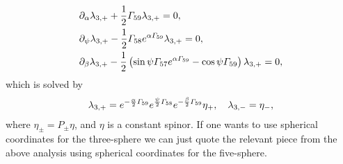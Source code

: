 \documentclass[11pt]{article}
\let\oldGamma=\Gamma
\renewcommand{\Gamma}{\mathnormal{\oldGamma}}
\newcommand{\sfrac}[2]{{\textstyle\frac{#1}{#2}}}
\newcommand{\p}{\partial}\newcommand{\quarter}{\sfrac{1}{4}}
\begin{document}
\begin{align}
&\p_\alpha\lambda_{3,+} + \frac{1}{2}\Gamma_{59} \lambda_{3,+} = 0,\nonumber\\
&\p_\psi\lambda_{3,+} - \frac{1}{2}  \Gamma_{58} e^{\alpha\Gamma_{59}}\lambda_{3,+} = 0,\nonumber\\
&\p_\beta\lambda_{3,+} - \frac{1}{2}\left(\sin\psi\Gamma_{57} e^{\alpha\Gamma_{59}}-\cos\psi\Gamma_{59}\right)\lambda_{3,+} = 0,
\end{align}
which is solved by
\begin{align}
\lambda_{3,+} = e^{-\frac{\alpha}{2}\Gamma_{59}}e^{\frac{\psi}{2}\Gamma_{58}}e^{-\frac{\beta}{2}\Gamma_{59}}\eta_+,\quad
\lambda_{3,-} = \eta_-,
\end{align}
where $\eta_{\pm} = P_\pm\eta$, and $\eta$ is a constant spinor.
If one wants to use spherical coordinates for the three-sphere we can just quote the relevant piece from the above analysis using spherical coordinates for the five-sphere.





\end{document}
